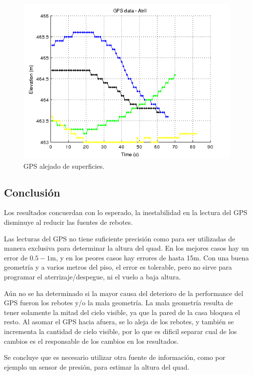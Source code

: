 \documentclass[spanish,12pt,a4paper,titlepage]{report}
\begin{document}
\newpage
\begin{figure}[h!]
\begin{center}
  \includegraphics[width=.75\textwidth]{./img/gps_atril.png}
  \caption{GPS alejado de superficies.}
  \label{fig:gps_atril.png}
\end{center}
\end{figure}

\subsection{Conclusión}
\label{sec:error-en-altura-conclusion}

Los resultados concuerdan con lo esperado, la inestabilidad en la lectura del GPS disminuye al reducir las fuentes de rebotes.

Las lecturas del GPS no tiene suficiente precisión como para ser utilizadas de manera exclusiva para determinar la altura del quad. En los mejores casos hay un error de $0.5-1$m, y en los peores casos hay errores de hasta 15m. Con una buena geometría y a varios metros del piso, el error es tolerable, pero no sirve para programar el aterrizaje/despegue, ni el vuelo a baja altura.

Aún no se ha determinado si la mayor causa del deterioro de la performance del GPS fueron los rebotes y/o la mala geometría. La mala geometría resulta de tener solamente la mitad del cielo visible, ya que la pared de la casa bloquea el resto. Al asomar el GPS hacia afuera, se lo aleja de los rebotes, y también se incrementa la cantidad de cielo visible, por lo que es dificil separar cual de los cambios es el responsable de los cambios en los resultados.

Se concluye que es necesario utilizar otra fuente de información, como por ejemplo un sensor de presión, para estimar la altura del quad.
\end{document}
